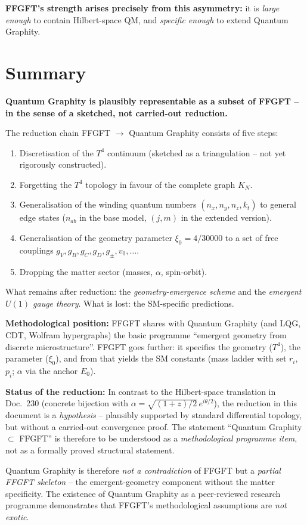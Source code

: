 \textbf{FFGFT's strength arises precisely from this asymmetry:}
it is \emph{large enough} to contain Hilbert-space QM, and
\emph{specific enough} to extend Quantum Graphity.

\section{Summary}

\textbf{Quantum Graphity is plausibly representable as a subset of
FFGFT -- in the sense of a sketched, not carried-out reduction.}

The reduction chain FFGFT $\to$ Quantum Graphity consists of five
steps:
\begin{enumerate}[leftmargin=2em,itemsep=2pt,topsep=2pt]
  \item Discretisation of the $T^4$ continuum (sketched as a
        triangulation -- not yet rigorously constructed).
  \item Forgetting the $T^4$ topology in favour of the complete
        graph $K_N$.
  \item Generalisation of the winding quantum numbers
        $(n_x, n_y, n_z, k_t)$ to general edge states ($n_{ab}$ in
        the base model, $(j, m)$ in the extended version).
  \item Generalisation of the geometry parameter
        $\xi_0 = 4/30000$ to a set of free couplings $g_V, g_B,
        g_C, g_D, g_\pm, v_0, \ldots$.
  \item Dropping the matter sector (masses, $\alpha$, spin-orbit).
\end{enumerate}

What remains after reduction: the \emph{geometry-emergence scheme}
and the \emph{emergent $U(1)$ gauge theory}. What is lost: the
SM-specific predictions.

\textbf{Methodological position:} FFGFT shares with Quantum Graphity
(and LQG, CDT, Wolfram hypergraphs) the basic programme
\enquote{emergent geometry from discrete microstructure}. FFGFT
goes further: it specifies the geometry ($T^4$), the parameter
($\xi_0$), and from that yields the SM constants (mass ladder with
set $r_i$, $p_i$; $\alpha$ via the anchor $E_0$).

\textbf{Status of the reduction:} In contrast to the Hilbert-space
translation in Doc.~230 (concrete bijection with
$\alpha = \sqrt{(1+z)/2}\,e^{i\theta/2}$), the reduction in this
document is a \emph{hypothesis} -- plausibly supported by standard
differential topology, but without a carried-out convergence proof.
The statement \enquote{Quantum Graphity $\subset$ FFGFT} is therefore
to be understood as a \emph{methodological programme item}, not as
a formally proved structural statement.

Quantum Graphity is therefore \emph{not a contradiction} of FFGFT
but a \emph{partial FFGFT skeleton} -- the emergent-geometry
component without the matter specificity. The existence of Quantum
Graphity as a peer-reviewed research programme demonstrates that
FFGFT's methodological assumptions are \emph{not exotic}.
